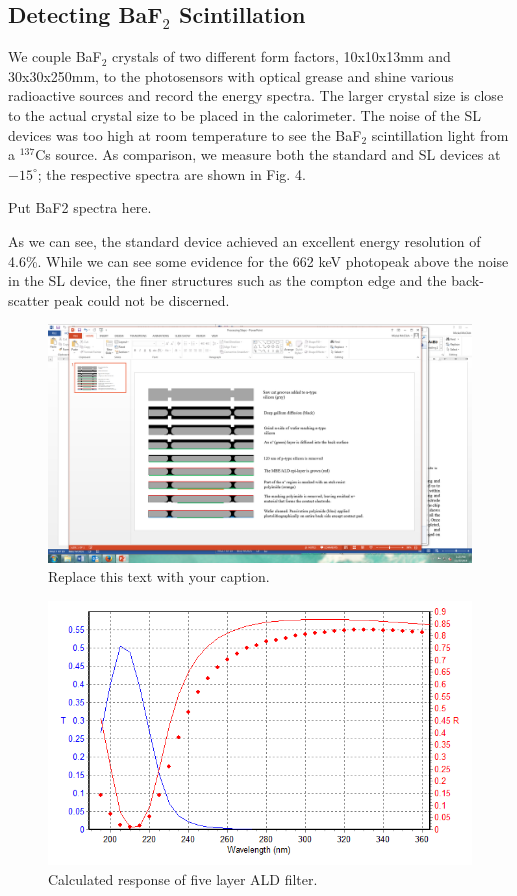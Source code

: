\subsection{Detecting BaF$_2$ Scintillation}

We couple BaF$_2$ crystals of two different form factors, 10x10x13mm and 30x30x250mm, to the photosensors with optical grease and shine various radioactive sources and record the energy spectra.  The larger crystal size is close to the actual crystal size to be placed in the calorimeter.  The noise of the SL devices was too high at room temperature to see the BaF$_2$ scintillation light from a $^{137}$Cs source. As comparison, we measure both the standard and SL devices at $-15^{\circ}$; the respective spectra are shown in Fig. 4.  

Put BaF2 spectra here.

As we can see, the standard device achieved an excellent energy resolution of 4.6\%.  While we can see some evidence for the 662 keV photopeak above the noise in the SL device, the finer structures such as the compton edge and the back-scatter peak could not be discerned.  

\begin{figure}[h!]
\begin{center}
\includegraphics[width=0.7\columnwidth]{Figures/RMD_process.png}
\caption{Replace this text with your caption.}
\end{center}
\end{figure}

\begin{figure}[h!]
\begin{center}
\includegraphics[width=0.7\columnwidth]{Figures/fivelayer.png}
\caption{Calculated response of five layer ALD filter.}
\end{center}
\end{figure}
